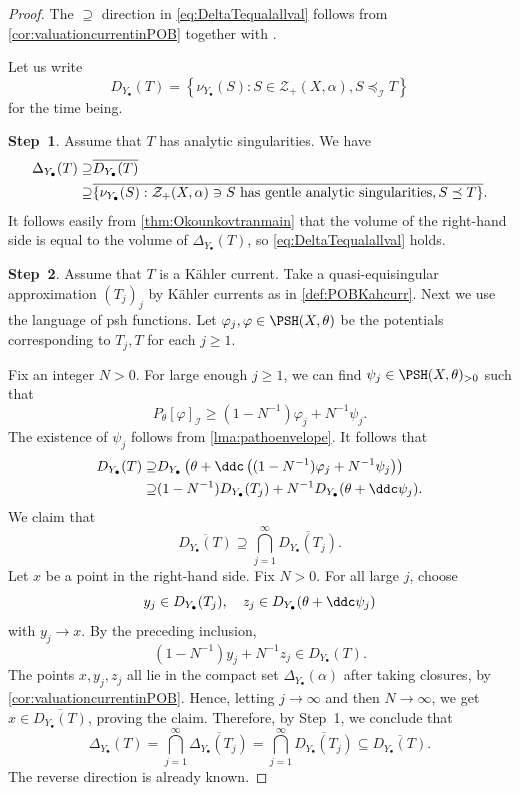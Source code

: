 \begin{proof}
    The $\supseteq$ direction in \eqref{eq:DeltaTequalallval} follows from \cref{cor:valuationcurrentinPOB} together with .

    Let us write
    \[
    D_{Y_{\bullet}}(T)=\left\{\nu_{Y_{\bullet}}(S):S\in \mathcal{Z}_+(X,\alpha),S\preceq_{\mathcal{I}}T\right\}
    \]
    for the time being.

    \textbf{Step~1}.
    Assume that $T$ has analytic singularities. We have
    \[
    \begin{split}
    \Delta_{Y_{\bullet}}(T)\supseteq & \overline{D_{Y_{\bullet}}(T)}\\
    \supseteq & \overline{\left\{\nu_{Y_{\bullet}}(S):\mathcal{Z}_+(X,\alpha)\ni S \textup{ has gentle analytic singularities}, S\preceq T\right\}}.
    \end{split}
    \]
    It follows easily from \cref{thm:Okounkovtranmain} that the volume of the right-hand side is equal to the volume of $\Delta_{Y_{\bullet}}(T)$, so \eqref{eq:DeltaTequalallval} holds.

    \textbf{Step~2}.
    Assume that $T$ is a Kähler current. Take a quasi-equisingular approximation $(T_j)_j$ by Kähler currents as in \cref{def:POBKahcurr}.
    Next we use the language of psh functions. Let $\varphi_j,\varphi\in \PSH(X,\theta)$ be the potentials corresponding to $T_j,T$ for each $j\geq 1$.

    Fix an integer $N>0$. For large enough $j\geq 1$, we can find $\psi_j\in \PSH(X,\theta)_{>0}$ such that
    \[
    P_{\theta}[\varphi]_{\mathcal{I}}\geq (1-N^{-1})\varphi_j+N^{-1} \psi_j.
    \]
    The existence of $\psi_j$ follows from \cref{lma:pathoenvelope}.
    It follows that
    \[
    \begin{aligned}
    D_{Y_{\bullet}}(T)\supseteq & D_{Y_{\bullet}}\left(\theta+\ddc \left((1-N^{-1})\varphi_j+N^{-1} \psi_j\right)\right)\\
    \supseteq & (1-N^{-1})D_{Y_{\bullet}}(T_j)+N^{-1} D_{Y_{\bullet}}(\theta+\ddc \psi_j).
    \end{aligned}
    \]
    We claim that
    \[
    \overline{D_{Y_{\bullet}}(T)}\supseteq \bigcap_{j=1}^{\infty}\overline{D_{Y_{\bullet}}(T_j)}.
    \]
    Let $x$ be a point in the right-hand side. Fix $N>0$. For all large $j$, choose
    \[
    y_j\in D_{Y_{\bullet}}(T_j),\quad z_j\in D_{Y_{\bullet}}(\theta+\ddc \psi_j)
    \]
    with $y_j\to x$. By the preceding inclusion,
    \[
    (1-N^{-1})y_j+N^{-1}z_j\in D_{Y_{\bullet}}(T).
    \]
    The points $x,y_j,z_j$ all lie in the compact set $\Delta_{Y_{\bullet}}(\alpha)$ after taking closures, by \cref{cor:valuationcurrentinPOB}. Hence, letting $j\to\infty$ and then $N\to\infty$, we get $x\in \overline{D_{Y_{\bullet}}(T)}$, proving the claim.
    Therefore, by Step~1, we conclude that
    \[
    \Delta_{Y_{\bullet}}(T)=\bigcap_{j=1}^{\infty}\overline{\Delta_{Y_{\bullet}}(T_j)}=\bigcap_{j=1}^{\infty}\overline{D_{Y_{\bullet}}(T_j)}\subseteq\overline{D_{Y_{\bullet}}(T)}.
    \]
The reverse direction is already known.


\end{proof}
